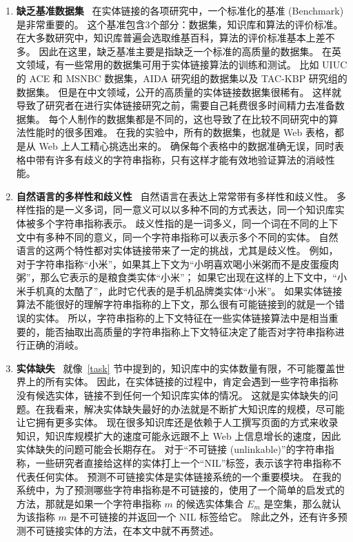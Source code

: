 \begin{enumerate}[1.]
\item \textbf{缺乏基准数据集} \ 
在实体链接的各项研究中，一个标准化的基准 (Benchmark) 是非常重要的。
这个基准包含3个部分：数据集，知识库和算法的评价标准。
在大多数研究中，知识库普遍会选取维基百科，算法的评价标准基本上差不多。
因此在这里，缺乏基准主要是指缺乏一个标准的高质量的数据集。
在英文领域，有一些常用的数据集可用于实体链接算法的训练和测试。
比如 UIUC 的 ACE 和 MSNBC 数据集，AIDA 研究组的数据集以及 TAC-KBP 研究组的数据集。
但是在中文领域，公开的高质量的实体链接数据集很稀有。
这样就导致了研究者在进行实体链接研究之前，需要自己耗费很多时间精力去准备数据集。
每个人制作的数据集都是不同的，这也导致了在比较不同研究中的算法性能时的很多困难。
在我的实验中，所有的数据集，也就是 Web 表格，都是从 Web 上人工精心挑选出来的。
确保每个表格中的数据准确无误，同时表格中带有许多有歧义的字符串指称，只有这样才能有效地验证算法的消岐性能。

\item \textbf{自然语言的多样性和歧义性} \ 
自然语言在表达上常常带有多样性和歧义性。
多样性指的是一义多词，同一意义可以以多种不同的方式表达，同一个知识库实体被多个字符串指称表示。
歧义性指的是一词多义，同一个词在不同的上下文中有多种不同的意义，同一个字符串指称可以表示多个不同的实体。
自然语言的这两个特性都对实体链接带来了一定的挑战，尤其是歧义性。
例如，对于字符串指称``小米''，如果其上下文为``小明喜欢喝小米粥而不是皮蛋瘦肉粥''，那么它表示的是粮食类实体``小米''；
如果它出现在这样的上下文中，``小米手机真的太酷了''，此时它代表的是手机品牌类实体``小米''。
如果实体链接算法不能很好的理解字符串指称的上下文，那么很有可能链接到的就是一个错误的实体。
所以，字符串指称的上下文特征在一些实体链接算法中是相当重要的，能否抽取出高质量的字符串指称上下文特征决定了能否对字符串指称进行正确的消岐。

\item \textbf{实体缺失} \ 
就像~\ref{task} 节中提到的，知识库中的实体数量有限，不可能覆盖世界上的所有实体。
因此，在实体链接的过程中，肯定会遇到一些字符串指称没有候选实体，链接不到任何一个知识库实体的情况。
这就是实体缺失的问题。在我看来，解决实体缺失最好的办法就是不断扩大知识库的规模，尽可能让它拥有更多实体。
现在很多知识库还是依赖于人工撰写页面的方式来收录知识，知识库规模扩大的速度可能永远跟不上 Web 上信息增长的速度，因此实体缺失的问题可能会长期存在。
对于``不可链接 (unlinkable)''的字符串指称，一些研究者\cite{wu2013zhishilink}\cite{dredze2010entity}直接给这样的实体打上一个``NIL''标签，表示该字符串指称不代表任何实体。
预测不可链接实体是实体链接系统的一个重要模块。
在我的系统中，为了预测哪些字符串指称是不可链接的，使用了一个简单的启发式的方法，那就是如果一个字符串指称 $m$ 的候选实体集合 $E_m$ 是空集，那么就认为该指称 $m$ 是不可链接的并返回一个 NIL 标签给它。
除此之外，还有许多预测不可链接实体的方法，在本文中就不再赘述。


\end{enumerate}



